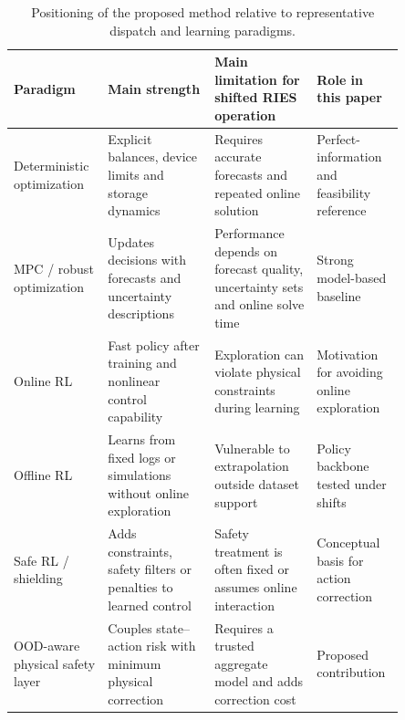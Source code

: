 \begin{table}[t]
\centering
\caption{Positioning of the proposed method relative to representative dispatch and learning paradigms.}
\label{tab:method_positioning}
\scriptsize
\setlength{\tabcolsep}{3pt}
\begin{tabular}{p{0.18\linewidth}p{0.25\linewidth}p{0.24\linewidth}p{0.18\linewidth}}
\toprule
Paradigm & Main strength & Main limitation for shifted RIES operation & Role in this paper \\
\midrule
Deterministic optimization & Explicit balances, device limits and storage dynamics & Requires accurate forecasts and repeated online solution & Perfect-information and feasibility reference \\
MPC / robust optimization & Updates decisions with forecasts and uncertainty descriptions & Performance depends on forecast quality, uncertainty sets and online solve time & Strong model-based baseline \\
Online RL & Fast policy after training and nonlinear control capability & Exploration can violate physical constraints during learning & Motivation for avoiding online exploration \\
Offline RL & Learns from fixed logs or simulations without online exploration & Vulnerable to extrapolation outside dataset support & Policy backbone tested under shifts \\
Safe RL / shielding & Adds constraints, safety filters or penalties to learned control & Safety treatment is often fixed or assumes online interaction & Conceptual basis for action correction \\
OOD-aware physical safety layer & Couples state--action risk with minimum physical correction & Requires a trusted aggregate model and adds correction cost & Proposed contribution \\
\bottomrule
\end{tabular}
\end{table}
